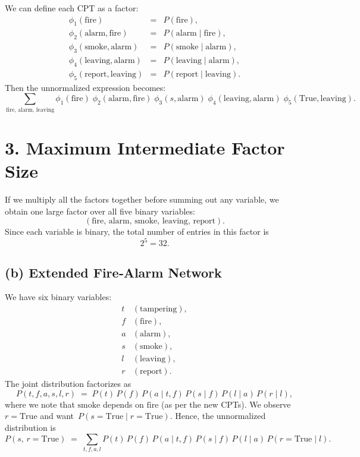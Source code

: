 \documentclass[11pt]{article}
\begin{document}
We can define each CPT as a factor:
\[
\begin{array}{rcl}
\phi_1(\text{fire}) &=& P(\text{fire}),\\[1mm]
\phi_2(\text{alarm},\text{fire}) &=& P(\text{alarm}\mid\text{fire}),\\[1mm]
\phi_3(\text{smoke},\text{alarm}) &=& P(\text{smoke}\mid\text{alarm}),\\[1mm]
\phi_4(\text{leaving},\text{alarm}) &=& P(\text{leaving}\mid\text{alarm}),\\[1mm]
\phi_5(\text{report},\text{leaving}) &=& P(\text{report}\mid\text{leaving}).
\end{array}
\]
Then the unnormalized expression becomes:
\[
\sum_{\text{fire},\,\text{alarm},\,\text{leaving}}
\phi_1(\text{fire})\;\phi_2(\text{alarm},\text{fire})\;\phi_3(s,\text{alarm})\;\phi_4(\text{leaving},\text{alarm})\;\phi_5(\text{True},\text{leaving}).
\]

\section*{3. Maximum Intermediate Factor Size}

If we multiply all the factors together before summing out any variable, we obtain one large factor over all five binary variables:
\[
(\text{fire},\,\text{alarm},\,\text{smoke},\,\text{leaving},\,\text{report}).
\]
Since each variable is binary, the total number of entries in this factor is
\[
2^5 = 32.
\]


\subsection*{(b) Extended Fire‐Alarm Network}

We have six binary variables:
\[
\begin{aligned}
t & (\text{tampering}),\\
f & (\text{fire}),\\
a & (\text{alarm}),\\
s & (\text{smoke}),\\
l & (\text{leaving}),\\
r & (\text{report}).
\end{aligned}
\]
The joint distribution factorizes as
\[
P(t,f,a,s,l,r)
\;=\;
P(t)\,P(f)\,P(a\mid t,f)\,P(s\mid f)\,P(l\mid a)\,P(r\mid l),
\]
where we note that \(\text{smoke}\) depends on \(\text{fire}\) (as per the new CPTs).  
We observe \(r=\mathrm{True}\) and want \(\,P(s=\mathrm{True}\mid r=\mathrm{True})\).  
Hence, the unnormalized distribution is
\[
P(s,\,r=\mathrm{True})
\;=\;
\sum_{t,f,a,l}
  P(t)\,P(f)\,P(a\mid t,f)\,P(s\mid f)\,P(l\mid a)\,P(r=\mathrm{True}\mid l).
\]
\end{document}
